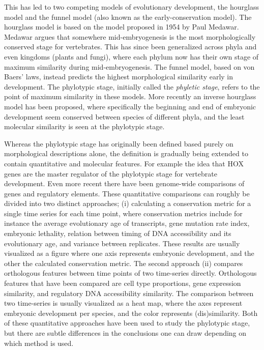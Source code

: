 This has led to two competing models of evolutionary development, the hourglass model and the funnel model (also known as the early-conservation model). The hourglass model is based on the model proposed in 1954 by Paul Medawar\cite{Medawar1954}. Medawar argues that somewhere mid-embryogenesis is the most morphologically conserved stage for vertebrates. This has since been generalized across phyla and even kingdoms (plants\cite{Quint2012} and fungi\cite{Cheng2015}), where each phylum now has their own stage of maximum similarity during mid-embryogenesis. The funnel model, based on von Baers' laws, instead predicts the highest morphological similarity early in development. The phylotypic stage, initially called the \textit{phyletic stage}, refers to the point of maximum similarity in these models\cite{Cohen1963, Seidel1960}. More recently an inverse hourglass model has been proposed, where specifically the beginning and end of embryonic development seem conserved between species of different phyla, and the least molecular similarity is seen at the phylotypic stage\cite{Levin2016}.

Whereas the phylotypic stage has originally been defined based purely on morphological descriptions alone, the definition is gradually being extended to contain quantitative and molecular features. For example the idea that HOX genes are the master regulator of the phylotypic stage for vertebrate development\cite{Duboule1994}. Even more recent there have been genome-wide comparisons of genes and regulatory elements. These quantitative comparisons can roughly be divided into two distinct approaches; (i) calculating a conservation metric for a single time series for each time point, where conservation metrics include for instance the average evolutionary age of transcripts\cite{DomazetLoso2010}, gene mutation rate index\cite{Quint2012, Piasecka2013}, embryonic lethality\cite{Uchida2018}, relation between timing of DNA accessibility and its evolutionary age\cite{Uesaka2019}, and variance between replicates\cite{Liu2020, Uchida2022}. These results are usually visualized as a figure where one axis represents embryonic development, and the other the calculated conservation metric. The second approach (ii) compares orthologous features between time points of two time-series directly. Orthologous features that have been compared are cell type proportions\cite{Mayshar2023}, gene expression similarity\cite{Irie2011, Kalinka2010, Levin2016, marletaz2018}, and regulatory DNA accessibility similarity\cite{Hu2017, Liu2021}. The comparison between two time-series is usually visualized as a heat map, where the axes represent embryonic development per species, and the color represents (dis)similarity. Both of these quantitative approaches have been used to study the phylotypic stage, but there are subtle differences in the conclusions one can draw depending on which method is used. 

